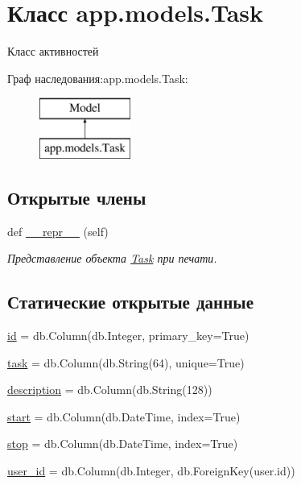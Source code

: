 \hypertarget{classapp_1_1models_1_1_task}{}\section{Класс app.\+models.\+Task}
\label{classapp_1_1models_1_1_task}


Класс активностей  


Граф наследования\+:app.\+models.\+Task\+:\begin{figure}[H]
\begin{center}
\leavevmode
\includegraphics[height=2.000000cm]{classapp_1_1models_1_1_task}
\end{center}
\end{figure}
\subsection*{Открытые члены}
\begin{DoxyCompactItemize}
\item 
def \mbox{\hyperlink{classapp_1_1models_1_1_task_a878962473a5595e85e499f7572bd9ebd}{\+\_\+\+\_\+repr\+\_\+\+\_\+}} (self)
\begin{DoxyCompactList}\small\item\em Представление объекта \mbox{\hyperlink{classapp_1_1models_1_1_task}{Task}} при печати. \end{DoxyCompactList}\end{DoxyCompactItemize}
\subsection*{Статические открытые данные}
\begin{DoxyCompactItemize}
\item 
\mbox{\hyperlink{classapp_1_1models_1_1_task_aad4ef074a554fa0ffe977cd4b934275a}{id}} = db.\+Column(db.\+Integer, primary\+\_\+key=True)
\item 
\mbox{\hyperlink{classapp_1_1models_1_1_task_aeab47ec2eef251bb3cb1b34f7ae140df}{task}} = db.\+Column(db.\+String(64), unique=True)
\item 
\mbox{\hyperlink{classapp_1_1models_1_1_task_af0ef177b07b0af27261c072ed5e550ee}{description}} = db.\+Column(db.\+String(128))
\item 
\mbox{\hyperlink{classapp_1_1models_1_1_task_aca1ae8c419c42f9122c02d0c788672cd}{start}} = db.\+Column(db.\+Date\+Time, index=True)
\item 
\mbox{\hyperlink{classapp_1_1models_1_1_task_a5fd4eea12e4fd7a4db19f3a04bf2a32f}{stop}} = db.\+Column(db.\+Date\+Time, index=True)
\item 
\mbox{\hyperlink{classapp_1_1models_1_1_task_a72b3ad4ca2c7c9d47262523bc91526ae}{user\+\_\+id}} = db.\+Column(db.\+Integer, db.\+Foreign\+Key(\textquotesingle{}user.\+id\textquotesingle{}))
\end{DoxyCompactItemize}


